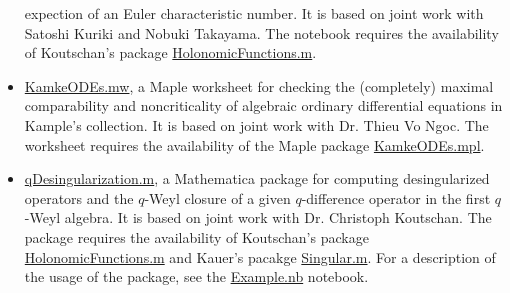 \documentclass[a4paper,12pt]{article}
\begin{document}
\begin{CJK*}{UTF8}{gbsn}
\begin{itemize}
    expection of an Euler characteristic number. It is based on joint work
    with Satoshi Kuriki and Nobuki Takayama. 
    The notebook requires the availability of Koutschan's package 
     \href{http://www.risc.jku.at/research/combinat/software/ergosum/RISC/HolonomicFunctions.html}{HolonomicFunctions.m}.
 \item \href{https://yzhang1616.github.io/KamkeODEs.mw}{KamkeODEs.mw}, a Maple worksheet for 
     checking the (completely) maximal comparability and noncriticality of algebraic
     ordinary differential equations in
     Kample's collection. It is based on joint work with Dr. Thieu Vo Ngoc. 
     The worksheet requires the availability of the Maple package \href{https://yzhang1616.github.io/KamkeODEs.mpl}{KamkeODEs.mpl}.
 \item \href{https://yzhang1616.github.io/qDesingularization.m}{qDesingularization.m}, a Mathematica
     package for computing desingularized operators and the $q$-Weyl closure of
     a given $q$-difference operator in
     the first $q$-Weyl algebra. It is based on joint work with Dr. Christoph
     Koutschan. The package requires the availability of Koutschan's package
     \href{http://www.risc.jku.at/research/combinat/software/ergosum/RISC/HolonomicFunctions.html}{HolonomicFunctions.m}
     and Kauer's pacakge \href{https://www.risc.jku.at/research/combinat/risc/software/Singular/index.html}{Singular.m}.
     For a description of the usage of the package, see the \href{https://yzhang1616.github.io/Example.nb}{Example.nb} notebook.
\end{itemize}


\end{CJK*}
\end{document}
